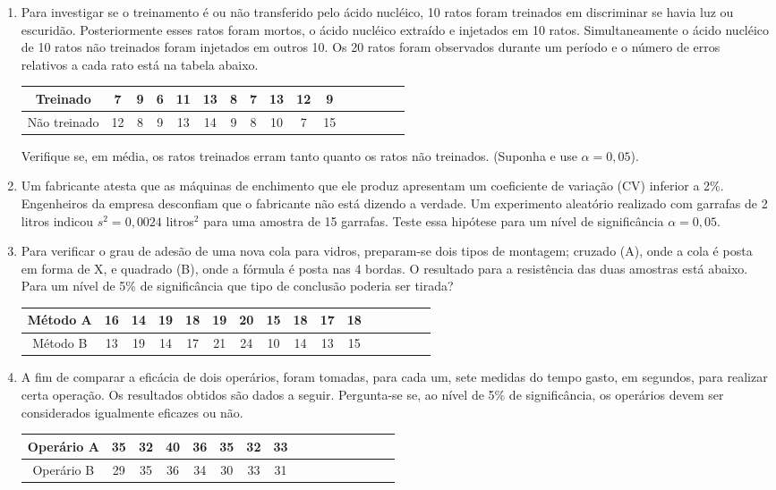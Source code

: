 \documentclass[10pt,brazil,addpoints]{exam}
\begin{document}
\begin{enumerate}[1.]
\medskip
\item Para investigar se o treinamento é ou não transferido pelo ácido nucléico, 10 ratos foram treinados em discriminar se havia luz ou escuridão. Posteriormente esses ratos foram mortos, o ácido nucléico extraído e injetados em 10 ratos. Simultaneamente o ácido nucléico de 10 ratos não treinados foram injetados em outros 10. Os 20 ratos foram observados durante um período e o número de erros relativos a cada rato está na tabela abaixo.
\begin{center}
\begin{tabular}{c|ccccccccccccccc}
Treinado & 7&9&6&11&13&8&7&13&12&9\\
\hline
Não treinado&12&8&9&13&14&9&8&10&7&15\\
\end{tabular}
\end{center}
Verifique se, em média, os ratos treinados erram tanto quanto os ratos não treinados. (Suponha  e use $\alpha= 0,05$).



\medskip
\item Um fabricante atesta que as máquinas de enchimento que ele produz apresentam um coeficiente de variação (CV) inferior a 2\%. Engenheiros da empresa desconfiam que o fabricante não está dizendo a verdade. Um experimento aleatório realizado com garrafas de 2 litros indicou $s^2=0,0024$ litros$^2$ para uma amostra de 15 garrafas. Teste essa hipótese para um nível de significância $\alpha = 0,05$.



\medskip
\item Para verificar o grau de adesão de uma nova cola para vidros, preparam-se dois tipos de montagem; cruzado (A), onde a cola é posta em forma de X, e quadrado (B), onde a fórmula é posta nas 4 bordas. O resultado para a resistência das duas amostras está abaixo. Para um nível de 5\% de significância que tipo de conclusão poderia ser tirada?
\begin{center}
\begin{tabular}{c|ccccccccccccccc}
Método A &16&14&19&18&19&20&15&18&17&18\\
\hline
Método B&13&19&14&17&21&24&10&14&13&15\\
\end{tabular}
\end{center}



\medskip
\item A fim de comparar a eficácia de dois operários, foram tomadas, para cada um, sete medidas do tempo gasto, em segundos, para realizar certa operação. Os resultados obtidos são dados a seguir. Pergunta-se se, ao nível de 5\% de significância, os operários devem ser considerados igualmente eficazes ou não.
\begin{center}
\begin{tabular}{c|ccccccccccccccc}
Operário A &35&32&40&36&35&32&33\\
\hline
Operário B &29&35&36&34&30&33&31\\
\end{tabular}
\end{center}





\end{enumerate}
\end{document}
